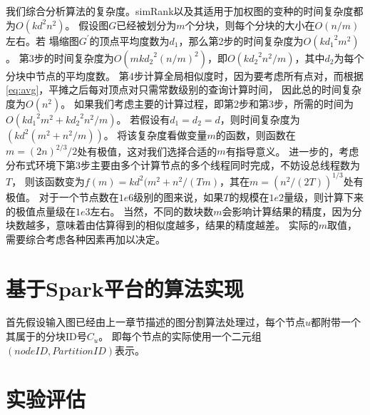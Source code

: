 \documentclass[master]{njuthesis}
\begin{document}
我们综合分析算法的复杂度。simRank以及其适用于加权图的变种的时间复杂度都为$O(kd^2n^2)$。
假设图$G$已经被划分为$m$个分块，则每个分块的大小在$O(n/m)$左右。若
塌缩图$G^\prime$的顶点平均度数为$d_1$，那么第2步的时间复杂度为$O(k{d_1}^2m^2)$。
第3步的时间复杂度为$O(mk{d_2}^2(n/m)^2)$，即$O(k{d_2}^2n^2/m)$，其中$d_2$为每个分块中节点的平均度数。
第4步计算全局相似度时，因为要考虑所有点对，而根据\ref{eq:avg}，平摊之后每对顶点对只需常数级别的查询计算时间，
因此总的时间复杂度为$O(n^2)$。
如果我们考虑主要的计算过程，即第2步和第3步，所需的时间为$O(k{d_1}^2m^2+k{d_2}^2n^2/m)$。
若假设有$d_1=d_2=d$，则时间复杂度为$(kd^2(m^2+n^2/m))$。 
将该复杂度看做变量$m$的函数，则函数在$m=(2n)^{2/3}/2$处有极值，这对我们选择合适的$m$有指导意义。
进一步的，考虑分布式环境下第3步主要由多个计算节点的多个线程同时完成，不妨设总线程数为$T$，
则该函数变为$f(m)=kd^2(m^2+n^2/(Tm)$，其在$m=(n^2/(2T))^{1/3}$处有极值。
对于一个节点数在$1e6$级别的图来说，如果$T$的规模在$1e2$量级，则计算下来的极值点量级在$1e3$左右。
当然，不同的数块数$m$会影响计算结果的精度，因为分块数越多，意味着由估算得到的相似度越多，结果的精度越差。
实际的$m$取值，需要综合考虑各种因素再加以决定。

\section{基于Spark平台的算法实现}
首先假设输入图已经由上一章节描述的图分割算法处理过，每个节点$u$都附带一个其属于的分块ID号$C_u$。
即每个节点的实际使用一个二元组$(nodeID, PartitionID)$表示。
\section{实验评估}
\end{document}
